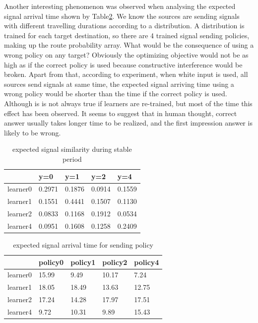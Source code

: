 \documentclass[11pt,a4paper]{article}
\begin{document}
\begin{multicols}{2}
  Another interesting phenomenon was observed when analysing the expected signal arrival time shown by Table\ref{tab:arrival-time}. 
  We know the sources are sending signals with different travelling durations according to a distribution. A distribution is trained for each 
  target destination, so there are 4 trained signal sending policies, making up the route probability array. What would be the consequence of using a 
  wrong policy on any target? Obviously the optimizing objective would not be as high as if the correct policy is used because constructive interference would be broken. 
  Apart from that, according to experiment, when white input is used, all sources send signals at same time, 
  the expected signal arriving time using a wrong policy would be shorter than the time if the correct policy is used. 
  Although is is not always true if learners are re-trained, but most of the time this effect has been observed. 
  It seems to suggest that in human thought, correct answer usually takes longer time to be realized, and the first impression answer is likely to be wrong. 
\end{multicols}

\begin{table}[]
  \centering
  \begin{tabular}{|l|l|l|l|l|}
  \hline
           & y=0    & y=1    & y=2    & y=4    \\ \hline
  learner0 & 0.2971 & 0.1876 & 0.0914 & 0.1559 \\ \hline
  learner1 & 0.1551 & 0.4441 & 0.1507 & 0.1130 \\ \hline
  learner2 & 0.0833 & 0.1168 & 0.1912 & 0.0534 \\ \hline
  learner4 & 0.0951 & 0.1608 & 0.1258 & 0.2409 \\ \hline
  \end{tabular}
  \caption{expected signal similarity during stable period} \label{tab:similar}
  \end{table}

\begin{table}[]
    \centering
    \begin{tabular}{|l|l|l|l|l|}
    \hline
              & policy0 & policy1 & policy2 & policy4 \\ \hline
    learner0 & 15.99   & 9.49    & 10.17   & 7.24    \\ \hline
    learner1 & 18.05   & 18.49   & 13.63   & 12.75   \\ \hline
    learner2 & 17.24   & 14.28   & 17.97   & 17.51   \\ \hline
    learner4 & 9.72    & 10.31   & 9.89    & 15.43   \\ \hline
    \end{tabular}
    \caption{expected signal arrival time for sending policy} \label{tab:arrival-time}  
  \end{table}
\end{document}
